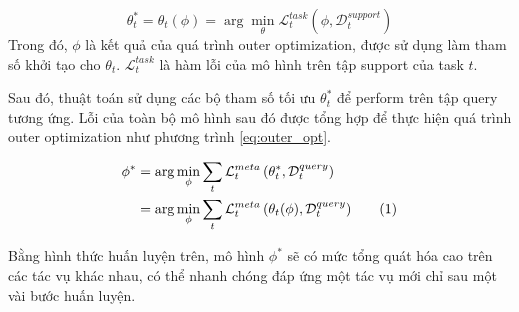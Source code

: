 \documentclass[aps,prb,groupedaddress,twocolumn,showpacs,dvipdfmx,superscriptaddress,pdftex]{revtex4-2}
\newcommand\numberthis{\addtocounter{equation}{1}\tag{\theequation}}
\begin{document}

\begin{equation}
    \theta_t^* = \theta_t(\phi) = \arg\min_{\theta}{\mathcal{L}^{task}_t\left( \phi, \mathcal{D}_t^{support} \right)}
    \label{eq:inner_opt}
\end{equation} Trong đó, $\phi$ là kết quả của quá trình outer optimization, được sử dụng làm tham số khởi tạo cho $\theta_t$. $\mathcal{L}^{task}_t$ là hàm lỗi của mô hình trên tập support của task $t$.


\vspace{2mm}

Sau đó, thuật toán sử dụng các bộ tham số tối ưu $\theta_t^*$ để perform trên tập query tương ứng. Lỗi của toàn bộ mô hình sau đó được tổng hợp để thực hiện quá trình outer optimization như phương trình \ref{eq:outer_opt}.


\begin{align*}
    \phi^* &= \arg\min_{\phi}\sum_{t}{\mathcal{L}^{meta}_t\left( \theta_t^*, \mathcal{D}_t^{query} \right)}\\
    &= \arg\min_{\phi}\sum_{t}{\mathcal{L}^{meta}_t\left( \theta_t(\phi), \mathcal{D}_t^{query} \right)} \numberthis
    \label{eq:outer_opt}
\end{align*}

Bằng hình thức huấn luyện trên, mô hình $\phi^*$ sẽ có mức tổng quát hóa cao trên các tác vụ khác nhau, có thể nhanh chóng đáp ứng một tác vụ mới chỉ sau một vài bước huấn luyện.
\end{document}
